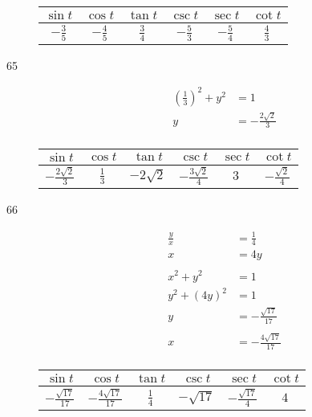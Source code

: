 \documentclass{exam}
\begin{document}
\begin{description}
        \begin{tabular}[H]{cccccc}
          \toprule
          $\sin t$        & $\cos t$        & $\tan t$      & $\csc t$        & $\sec t$        & $\cot t$ \\
          \midrule
          $- \frac{3}{5}$ & $- \frac{4}{5}$ & $\frac{3}{4}$ & $- \frac{5}{3}$ & $- \frac{5}{4}$ & $\frac{4}{3}$ \\
          \bottomrule
        \end{tabular}

      \item[65]
        \begin{align*}
          \left( \frac{1}{3} \right)^2 + y^2 & = 1 \\
          y                                  & = - \frac{2 \sqrt{2}}{3} \\
        \end{align*}

        \begin{tabular}[H]{cccccc}
          \toprule
          $\sin t$                 & $\cos t$      & $\tan t$       & $\csc t$                 & $\sec t$ & $\cot t$ \\
          \midrule
          $- \frac{2 \sqrt{2}}{3}$ & $\frac{1}{3}$ & $- 2 \sqrt{2}$ & $- \frac{3 \sqrt{2}}{4}$ & $3$      & $- \frac{\sqrt{2}}{4}$ \\
          \bottomrule
        \end{tabular}

      \pagebreak

      \item[66]
        \begin{align*}
          \frac{y}{x}  & = \frac{1}{4} \\
          x            & = 4y \\
          \\
          x^2 + y^2    & = 1 \\
          y^2 + (4y)^2 & = 1 \\
          y            & = -\frac{\sqrt{17}}{17} \\
          \\
          x            & = -\frac{4 \sqrt{17}}{17} \\
        \end{align*}

        \begin{tabular}[H]{cccccc}
          \toprule
          $\sin t$                & $\cos t$                  & $\tan t$      & $\csc t$     & $\sec t$               & $\cot t$ \\
          \midrule
          $-\frac{\sqrt{17}}{17}$ & $-\frac{4 \sqrt{17}}{17}$ & $\frac{1}{4}$ & $-\sqrt{17}$ & $-\frac{\sqrt{17}}{4}$ & $4$ \\
          \bottomrule
        \end{tabular}


\end{description}
\end{document}
